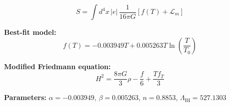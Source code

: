 
\begin{equation}
  S = \int d^4x \, |e| \, \frac{1}{16\pi G} \left[ f(T) + \mathcal{L}_m \right]
\end{equation}

\textbf{Best-fit model:}
\begin{equation}
  f(T) = -0.003949 T + 0.005263 T \ln\!\left(\frac{T}{T_0}\right)
\end{equation}

\textbf{Modified Friedmann equation:}
\begin{equation}
  H^2 = \frac{8\pi G}{3} \rho - \frac{f}{6} + \frac{T f_T}{3}
\end{equation}

\textbf{Parameters:}
$\alpha = -0.003949$, \quad
$\beta = 0.005263$, \quad
$n = 0.8853$, \quad
$\Lambda_{\text{BI}} = 527.1303$